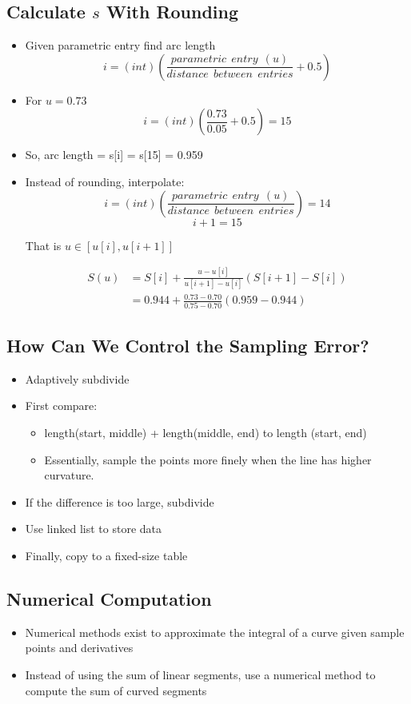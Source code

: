 \documentclass{article}
\begin{document}
\subsection*{Calculate $s$ With Rounding}
\begin{itemize}
    \item Given parametric entry find arc length
    \[i = (int)\left(\frac{parametric\:\:entry\:\:(u)}{distance\:\:between\:\:entries} + 0.5\right)\]
    \item For $u = 0.73$
    \[i = (int) \left(\frac{0.73}{0.05}+ 0.5\right) = 15\]
    \item So, arc length = s[i] = s[15] = 0.959
    \item Instead of rounding, interpolate:
    \[i = (int)\left(\frac{parametric\:\:entry\:\:(u)}{distance\:\:between\:\:entries}\right) = 14\]
    \[i + 1 = 15\]
    \begin{center}
        That is $u \in [u[i], u[i + 1]]$
    \end{center}
    \begin{align*}
        S(u) &= S[i] + \frac{u - u[i]}{u[i + 1] - u[i]}(S[i + 1] - S[i])\\
        &= 0.944 + \frac{0.73 - 0.70}{0.75 - 0.70} (0.959 - 0.944)
    \end{align*}
\end{itemize}

\subsection*{How Can We Control the Sampling Error?}
\begin{itemize}
    \item Adaptively subdivide
    \item First compare:
    \begin{itemize}
        \item length(start, middle) + length(middle, end) to length (start, end)
        \item Essentially, sample the points more finely when the line has higher curvature.
    \end{itemize}
    \item If the difference is too large, subdivide
    \item Use linked list to store data
    \item Finally, copy to a fixed-size table
\end{itemize}

\subsection*{Numerical Computation}
\begin{itemize}
    \item Numerical methods exist to approximate the integral of a curve given sample points and derivatives
    \item Instead of using the sum of linear segments, use a numerical method to compute the sum of curved segments
\end{itemize}
\end{document}
